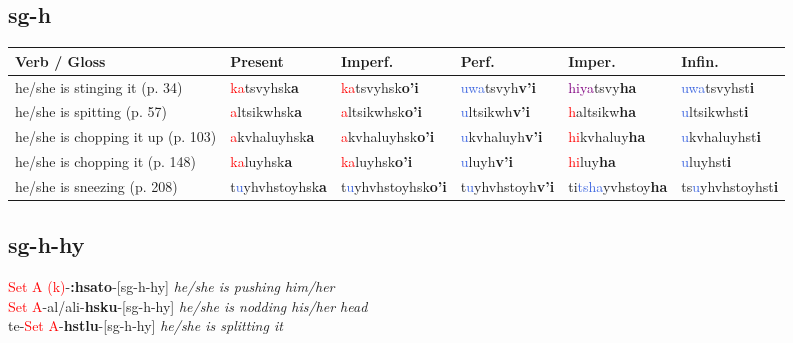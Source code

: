 \documentclass[oneside,openany]{book}%
\begin{document}
\subsection*{sg-h}%
\begin{tabularx}{\textwidth}{>{\hsize=1.5\hsize\RaggedRight}X >{\hsize=0.9\hsize}X >{\hsize=0.9\hsize}X >{\hsize=0.9\hsize}X >{\hsize=0.9\hsize}X >{\hsize=0.9\hsize}X}%
\toprule%
\textbf{Verb / Gloss}&\textbf{Present}&\textbf{Imperf.}&\textbf{Perf.}&\textbf{Imper.}&\textbf{Infin.}\\%
\midrule%
he/she is stinging it (p. 34)&\textcolor{Red}{ka}tsvyhsk\textbf{a}&\textcolor{Red}{ka}tsvyhsk\textbf{o'i}&\textcolor{RoyalBlue}{uwa}tsvyh\textbf{v'i}&\textcolor{Purple}{hiya}tsvy\textbf{ha}&\textcolor{RoyalBlue}{uwa}tsvyhst\textbf{i}\\%
he/she is spitting (p. 57)&\textcolor{Red}{a}ltsikwhsk\textbf{a}&\textcolor{Red}{a}ltsikwhsk\textbf{o'i}&\textcolor{RoyalBlue}{u}ltsikwh\textbf{v'i}&\textcolor{Red}{h}altsikw\textbf{ha}&\textcolor{RoyalBlue}{u}ltsikwhst\textbf{i}\\%
he/she is chopping it up (p. 103)&\textcolor{Red}{a}kvhaluyhsk\textbf{a}&\textcolor{Red}{a}kvhaluyhsk\textbf{o'i}&\textcolor{RoyalBlue}{u}kvhaluyh\textbf{v'i}&\textcolor{Red}{hi}kvhaluy\textbf{ha}&\textcolor{RoyalBlue}{u}kvhaluyhst\textbf{i}\\%
he/she is chopping it (p. 148)&\textcolor{Red}{ka}luyhsk\textbf{a}&\textcolor{Red}{ka}luyhsk\textbf{o'i}&\textcolor{RoyalBlue}{u}luyh\textbf{v'i}&\textcolor{Red}{hi}luy\textbf{ha}&\textcolor{RoyalBlue}{u}luyhst\textbf{i}\\%
he/she is sneezing (p. 208)&t\textcolor{RoyalBlue}{u}yhvhstoyhsk\textbf{a}&t\textcolor{RoyalBlue}{u}yhvhstoyhsk\textbf{o'i}&t\textcolor{RoyalBlue}{u}yhvhstoyh\textbf{v'i}&ti\textcolor{RoyalBlue}{tsha}yvhstoy\textbf{ha}&ts\textcolor{RoyalBlue}{u}yhvhstoyhst\textbf{i}\\%
\bottomrule%
\end{tabularx}%
\vspace{1em}%
\needspace{1in}%
\subsection*{sg-h-hy}%
\textcolor{Red}{Set A (k)}{-}\textbf{:hsato}{-}[sg-h-hy] \textit{ he/she is pushing him/her} \\%
\textcolor{Red}{Set A}{-}al/ali{-}\textbf{hsku}{-}[sg-h-hy] \textit{ he/she is nodding his/her head} \\%
te{-}\textcolor{Red}{Set A}{-}\textbf{hstlu}{-}[sg-h-hy] \textit{ he/she is splitting it} \\%
\vspace{1em}%
\needspace{1in}%
\end{document}
